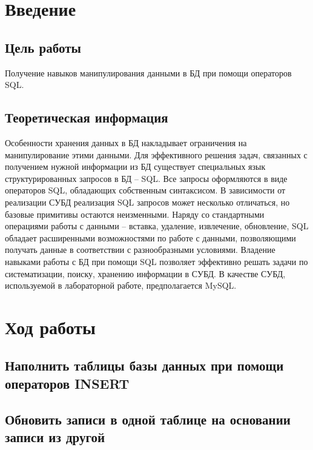 \chapter{Введение}

\section{Цель работы}

Получение навыков манипулирования данными в БД при помощи операторов SQL.

\section{Теоретическая информация}

Особенности хранения данных в БД накладывает ограничения на манипулирование этими данными. Для эффективного решения задач, связанных с получением нужной информации из БД существует специальных язык структурированных запросов в БД – SQL. Все запросы оформляются в виде операторов SQL, обладающих собственным синтаксисом. В зависимости от реализации СУБД реализация SQL запросов может несколько отличаться, но базовые примитивы остаются неизменными. Наряду со стандартными операциями работы с данными – вставка, удаление, извлечение, обновление, SQL обладает расширенными возможностями по работе с данными, позволяющими получать данные в соответствии с разнообразными условиями. Владение навыками работы с БД при помощи SQL позволяет эффективно решать задачи по систематизации, поиску, хранению информации в СУБД.
В качестве СУБД, используемой в лабораторной работе, предполагается MySQL. 

\chapter{Ход работы}



\section{Наполнить таблицы базы данных при помощи операторов INSERT}




\section{Обновить записи в одной таблице на основании записи из другой}



